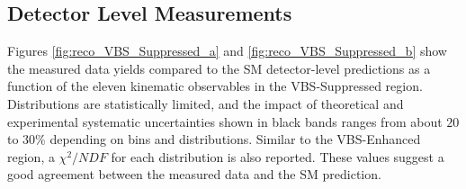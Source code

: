 \subsection{Detector Level Measurements}
\label{appendix:VBSSupReco}

Figures \ref{fig:reco_VBS_Suppressed_a} and \ref{fig:reco_VBS_Suppressed_b} show the measured data yields compared to the SM detector-level predictions as a function of the eleven kinematic observables in the VBS-Suppressed region. Distributions are statistically limited, and the impact of theoretical and experimental systematic uncertainties shown in black bands ranges from about $20$ to $30\%$ depending on bins and distributions. Similar to the VBS-Enhanced region, a $\chi^2/NDF$ for each distribution is also reported. These values suggest a good agreement between the measured data and the SM prediction. 


